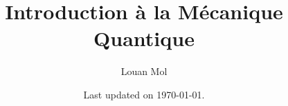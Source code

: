 \documentclass[a4paper,10pt]{article}
\title{\textbf{Introduction à la Mécanique Quantique}}
\author{Louan Mol}
\date{Last updated on \today.}
\begin{document}
%

\maketitle

\nocite{keylist}

\tableofcontents

\pagebreak

\printbibliography

\pagebreak














\end{document}
